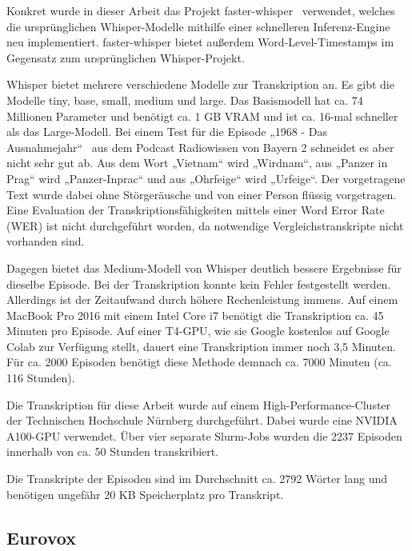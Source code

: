 Konkret wurde in dieser Arbeit das Projekt faster-whisper~\cite{2024c} verwendet, welches die ursprünglichen Whisper-Modelle mithilfe einer schnelleren Inferenz-Engine neu implementiert.
faster-whisper bietet außerdem Word-Level-Timestamps im Gegensatz zum ursprünglichen Whisper-Projekt.

Whisper bietet mehrere verschiedene Modelle zur Transkription an.
Es gibt die Modelle tiny, base, small, medium und large.
Das Basismodell hat ca. 74 Millionen Parameter und benötigt ca. 1 GB VRAM und ist ca. 16-mal schneller als das Large-Modell.
Bei einem Test für die Episode „1968 - Das Ausnahmejahr“~\cite{zotero-543} aus dem Podcast Radiowissen von Bayern 2 schneidet es aber nicht sehr gut ab.
Aus dem Wort „Vietnam“ wird „Wirdnam“, aus „Panzer in Prag“ wird „Panzer-Inprac“ und aus „Ohrfeige“ wird „Urfeige“.
Der vorgetragene Text wurde dabei ohne Störgeräusche und von einer Person flüssig vorgetragen.
Eine Evaluation der Transkriptionsfähigkeiten mittels einer Word Error Rate (WER) ist nicht durchgeführt worden, da notwendige Vergleichstranskripte nicht vorhanden sind.

Dagegen bietet das Medium-Modell von Whisper deutlich bessere Ergebnisse für dieselbe Episode.
Bei der Transkription konnte kein Fehler festgestellt werden.
Allerdings ist der Zeitaufwand durch höhere Rechenleistung immens.
Auf einem MacBook Pro 2016 mit einem Intel Core i7 benötigt die Transkription ca. 45 Minuten pro Episode.
Auf einer T4-GPU, wie sie Google kostenlos auf Google Colab zur Verfügung stellt, dauert eine Transkription immer noch 3,5 Minuten.
Für ca. 2000 Episoden benötigt diese Methode demnach ca. 7000 Minuten (ca. 116 Stunden).

Die Transkription für diese Arbeit wurde auf einem High-Performance-Cluster der Technischen Hochschule Nürnberg durchgeführt.
Dabei wurde eine NVIDIA A100-GPU verwendet.
Über vier separate Slurm-Jobs wurden die 2237 Episoden innerhalb von ca. 50 Stunden transkribiert.

Die Transkripte der Episoden sind im Durchschnitt ca. 2792 Wörter lang und benötigen ungefähr 20 KB Speicherplatz pro Transkript.



\subsection{Eurovox}

